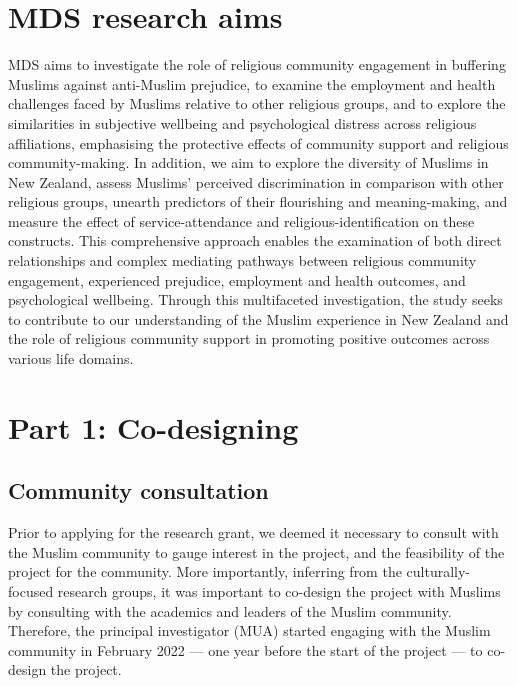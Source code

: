 \documentclass[
]{interact}
\begin{document}
\section{MDS research aims}\label{mds-research-aims}

MDS aims to investigate the role of religious community engagement in
buffering Muslims against anti-Muslim prejudice, to examine the
employment and health challenges faced by Muslims relative to other
religious groups, and to explore the similarities in subjective
wellbeing and psychological distress across religious affiliations,
emphasising the protective effects of community support and religious
community-making. In addition, we aim to explore the diversity of
Muslims in New Zealand, assess Muslims' perceived discrimination in
comparison with other religious groups, unearth predictors of their
flourishing and meaning-making, and measure the effect of
service-attendance and religious-identification on these constructs.
This comprehensive approach enables the examination of both direct
relationships and complex mediating pathways between religious community
engagement, experienced prejudice, employment and health outcomes, and
psychological wellbeing. Through this multifaceted investigation, the
study seeks to contribute to our understanding of the Muslim experience
in New Zealand and the role of religious community support in promoting
positive outcomes across various life domains.

\section{Part 1: Co-designing}\label{part-1-co-designing}

\subsection{Community consultation}\label{community-consultation}

Prior to applying for the research grant, we deemed it necessary to
consult with the Muslim community to gauge interest in the project, and
the feasibility of the project for the community. More importantly,
inferring from the culturally-focused research groups, it was important
to co-design the project with Muslims by consulting with the academics
and leaders of the Muslim community. Therefore, the principal
investigator (MUA) started engaging with the Muslim community in
February 2022 --- one year before the start of the project --- to
co-design the project.
\end{document}
